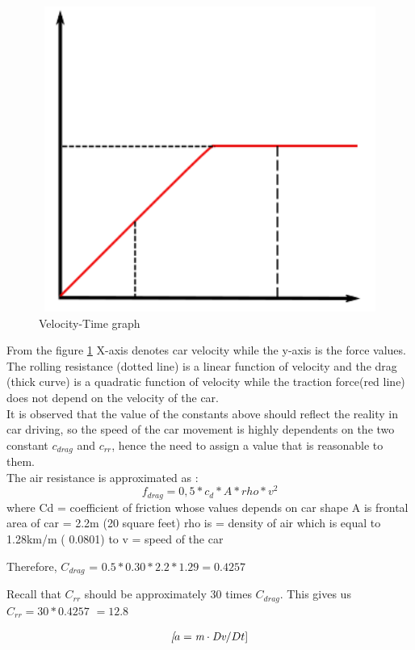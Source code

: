 \documentclass{book}
\begin{document}
\begin{figure}
\centering
\includegraphics[width=15cm,height=10cm]{Velocitycumtimegraph}
\caption{Velocity-Time graph}
\label{fig:velocityforce}
\end{figure}
 From the figure \cref{fig:velocityforce} X-axis denotes car velocity while the y-axis is the force values. \\
 The rolling resistance (dotted line) is a linear function of velocity and the drag (thick curve) is a quadratic function of velocity while the traction force(red line) does not depend on the velocity of the car.\\
 It is observed that the value of the constants above should reflect the reality in car driving, so the speed of the car movement is highly dependents on the two constant $c_{drag}$ and $c_{rr}$, hence the need to assign a value that is reasonable to them. \\
 The air resistance is approximated as :
 \begin{equation}
   f_{drag} = 0,5 * c_d * A * rho * v ^ 2
 \end{equation}
where Cd = coefficient of friction whose values depends on car shape
    A is frontal area of car = 2.2m (20 square feet)
    rho is = density of air which is equal to 1.28km/m ( 0.0801) to
    v = speed of the car

 Therefore, $C_{drag}$  = $0.5 * 0.30 * 2.2 * 1.29 = 0.4257$

 Recall that $C_{rr}$ should be approximately 30 times $C_{drag}$.  This gives us
    $C_{rr} = 30 * 0.4257$
          $= 12.8$

\begin{eqnarray}
\textit [{a} = \textit{m} \cdot \textit{Dv} / {Dt}]
\end{eqnarray}
\end{document}
